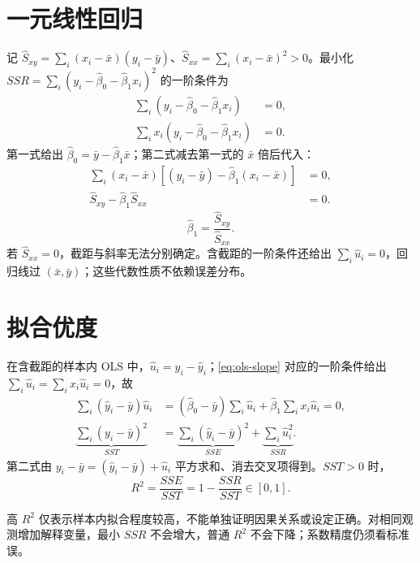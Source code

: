 \section{一元线性回归}\label{sec:ols-slope}
\label{sec:prf-srf}
\label{sec:foc}
\begin{proofbox}[title=推导]
记 $\hat S_{xy}=\sum_i(x_i-\bar x)(y_i-\bar y)$、$\hat S_{xx}=\sum_i(x_i-\bar x)^2>0$。最小化 $SSR=\sum_i(y_i-\hat\beta_0-\hat\beta_1x_i)^2$ 的一阶条件为
\begin{align*}
\sum_i(y_i-\hat\beta_0-\hat\beta_1x_i)&=0,\\
\sum_ix_i(y_i-\hat\beta_0-\hat\beta_1x_i)&=0.
\end{align*}
第一式给出 $\hat\beta_0=\bar y-\hat\beta_1\bar x$；第二式减去第一式的 $\bar x$ 倍后代入：
\begin{align*}
\sum_i(x_i-\bar x)[(y_i-\bar y)-\hat\beta_1(x_i-\bar x)]&=0,\\
\hat S_{xy}-\hat\beta_1\hat S_{xx}&=0.
\end{align*}
\begin{equation}
\hat\beta_1=\frac{\hat S_{xy}}{\hat S_{xx}}.\label{eq:ols-slope}
\end{equation}
若 $\hat S_{xx}=0$，截距与斜率无法分别确定。含截距的一阶条件还给出 $\sum_i\hat u_i=0$，回归线过 $(\bar x,\bar y)$；这些代数性质不依赖误差分布。
\end{proofbox}
\section{拟合优度}\label{sec:r-squared}
\label{sec:sst-decomp}
\begin{proofbox}[title=推导]
在含截距的样本内 OLS 中，$\hat u_i=y_i-\hat y_i$；\eqref{eq:ols-slope} 对应的一阶条件给出 $\sum_i\hat u_i=\sum_ix_i\hat u_i=0$，故
\begin{align*}
\sum_i(\hat y_i-\bar y)\hat u_i
&=(\hat\beta_0-\bar y)\sum_i\hat u_i+\hat\beta_1\sum_ix_i\hat u_i=0,\\
\underbrace{\sum_i(y_i-\bar y)^2}_{SST}
&=\underbrace{\sum_i(\hat y_i-\bar y)^2}_{SSE}+\underbrace{\sum_i\hat u_i^2}_{SSR}.
\end{align*}
第二式由 $y_i-\bar y=(\hat y_i-\bar y)+\hat u_i$ 平方求和、消去交叉项得到。$SST>0$ 时，
\begin{equation}
R^2=\frac{SSE}{SST}=1-\frac{SSR}{SST}\in[0,1].\label{eq:r-squared}
\end{equation}
\end{proofbox}
\label{sec:r2-misread}
高 $R^2$ 仅表示样本内拟合程度较高，不能单独证明因果关系或设定正确。对相同观测增加解释变量，最小 $SSR$ 不会增大，普通 $R^2$ 不会下降；系数精度仍须看标准误。
